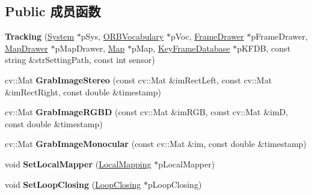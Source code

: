 \subsection*{Public 成员函数}
\begin{DoxyCompactItemize}
\item 
\hypertarget{classORB__SLAM2_1_1Tracking_a2e5ff2f26f1518166a028911b830c5b1}{{\bfseries Tracking} (\hyperlink{classORB__SLAM2_1_1System}{System} $\ast$p\-Sys, \hyperlink{classDBoW2_1_1TemplatedVocabulary}{O\-R\-B\-Vocabulary} $\ast$p\-Voc, \hyperlink{classORB__SLAM2_1_1FrameDrawer}{Frame\-Drawer} $\ast$p\-Frame\-Drawer, \hyperlink{classORB__SLAM2_1_1MapDrawer}{Map\-Drawer} $\ast$p\-Map\-Drawer, \hyperlink{classORB__SLAM2_1_1Map}{Map} $\ast$p\-Map, \hyperlink{classORB__SLAM2_1_1KeyFrameDatabase}{Key\-Frame\-Database} $\ast$p\-K\-F\-D\-B, const string \&str\-Setting\-Path, const int sensor)}\label{classORB__SLAM2_1_1Tracking_a2e5ff2f26f1518166a028911b830c5b1}

\item 
\hypertarget{classORB__SLAM2_1_1Tracking_a7cba47a41978fc1c83f47547813aff2c}{cv\-::\-Mat {\bfseries Grab\-Image\-Stereo} (const cv\-::\-Mat \&im\-Rect\-Left, const cv\-::\-Mat \&im\-Rect\-Right, const double \&timestamp)}\label{classORB__SLAM2_1_1Tracking_a7cba47a41978fc1c83f47547813aff2c}

\item 
\hypertarget{classORB__SLAM2_1_1Tracking_a99cf542c9a7cc551745877cc11ce8ef9}{cv\-::\-Mat {\bfseries Grab\-Image\-R\-G\-B\-D} (const cv\-::\-Mat \&im\-R\-G\-B, const cv\-::\-Mat \&im\-D, const double \&timestamp)}\label{classORB__SLAM2_1_1Tracking_a99cf542c9a7cc551745877cc11ce8ef9}

\item 
\hypertarget{classORB__SLAM2_1_1Tracking_ad3de28bf6f7638c4da2248c9d595f394}{cv\-::\-Mat {\bfseries Grab\-Image\-Monocular} (const cv\-::\-Mat \&im, const double \&timestamp)}\label{classORB__SLAM2_1_1Tracking_ad3de28bf6f7638c4da2248c9d595f394}

\item 
\hypertarget{classORB__SLAM2_1_1Tracking_a95061551f3756408221df3b1a996b777}{void {\bfseries Set\-Local\-Mapper} (\hyperlink{classORB__SLAM2_1_1LocalMapping}{Local\-Mapping} $\ast$p\-Local\-Mapper)}\label{classORB__SLAM2_1_1Tracking_a95061551f3756408221df3b1a996b777}

\item 
\hypertarget{classORB__SLAM2_1_1Tracking_a92b878e0559740646f8b1c635ac068dc}{void {\bfseries Set\-Loop\-Closing} (\hyperlink{classORB__SLAM2_1_1LoopClosing}{Loop\-Closing} $\ast$p\-Loop\-Closing)}\label{classORB__SLAM2_1_1Tracking_a92b878e0559740646f8b1c635ac068dc}


\end{DoxyCompactItemize}

